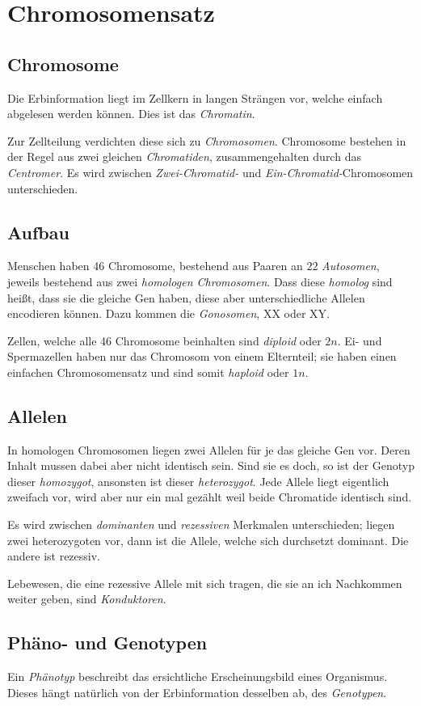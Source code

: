 \documentclass{article}
\begin{document}
\section{Chromosomensatz} 
\subsection{Chromosome} 
Die Erbinformation liegt im Zellkern in langen Strängen vor, welche einfach abgelesen werden können. Dies ist das \emph{Chromatin}.
 
Zur Zellteilung verdichten diese sich zu \emph{Chromosomen}. Chromosome bestehen in der Regel aus zwei gleichen \emph{Chromatiden}, zusammengehalten durch das \emph{Centromer}. Es wird zwischen \emph{Zwei-Chromatid-} und \emph{Ein-Chromatid-}Chromosomen unterschieden.
 
\subsection{Aufbau}
Menschen haben 46 Chromosome, bestehend aus Paaren an $22$ \emph{Autosomen}, jeweils bestehend aus zwei \emph{homologen Chromosomen}. Dass diese \emph{homolog} sind heißt, dass sie die gleiche Gen haben, diese aber unterschiedliche Allelen encodieren können. Dazu kommen die \emph{Gonosomen}, XX oder XY.
 
Zellen, welche alle 46 Chromosome beinhalten sind \emph{diploid} oder $2n$. Ei- und Spermazellen haben nur das Chromosom von einem Elternteil; sie haben einen einfachen Chromosomensatz und sind somit \emph{haploid} oder $1n$. 
 
\subsection{Allelen}
In homologen Chromosomen liegen zwei Allelen für je das gleiche Gen vor. Deren Inhalt mussen dabei aber nicht identisch sein. Sind sie es doch, so ist der Genotyp dieser \emph{homozygot}, ansonsten ist dieser \emph{heterozygot}. Jede Allele liegt eigentlich zweifach vor, wird aber nur ein mal gezählt weil beide Chromatide identisch sind.
 
Es wird zwischen \emph{dominanten} und \emph{rezessiven} Merkmalen unterschieden; liegen zwei heterozygoten vor, dann ist die Allele, welche sich durchsetzt dominant. Die andere ist rezessiv.
 
Lebewesen, die eine rezessive Allele mit sich tragen, die sie an ich Nachkommen weiter geben, sind \emph{Konduktoren}.  
 
\subsection{Phäno- und Genotypen}
Ein \emph{Phänotyp} beschreibt das ersichtliche Erscheinungsbild eines Organismus. Dieses hängt natürlich von der Erbinformation desselben ab, des \emph{Genotypen}.
\end{document}
